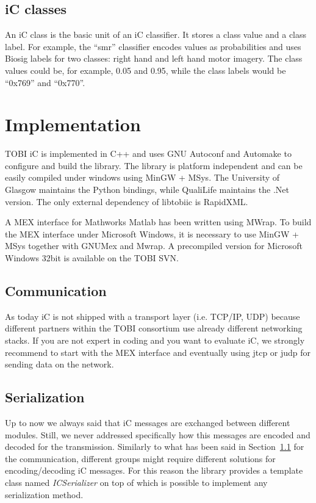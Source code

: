 \documentclass[a4paper,10pt]{article}
\begin{document}
\subsection{iC classes}
\label{sec:icclass}
An iC class is the basic unit of an iC classifier. It stores a class value and a
class label. For example, the ``smr'' classifier encodes values as probabilities
and uses Biosig labels for two classes: right hand  and left hand motor imagery.
The class values could be, for example, 0.05 and 0.95, while the class labels
would be ``0x769'' and ``0x770''.

\section{Implementation}
\label{sec:implementation}
TOBI iC is implemented in C++ and uses GNU Autoconf and Automake to configure
and build the library. The library is platform independent and can be easily
compiled under windows using MinGW + MSys. The University of Glasgow maintains
the Python bindings, while QualiLife maintains the .Net version.
The only external dependency of libtobiic is RapidXML.

A MEX interface for Mathworks Matlab has been written using MWrap. To build the
MEX interface under Microsoft Windows, it is necessary to use MinGW + MSys
together with GNUMex and Mwrap. A precompiled version for Microsoft Windows
32bit is available on the TOBI SVN.

\subsection{Communication}
\label{sec:transport}
As today iC is not shipped with a transport layer (i.e. TCP/IP, UDP) because
different partners within the TOBI consortium use already different networking
stacks. 
If you are not expert in coding and you want to evaluate iC, we strongly
recommend to start with the MEX interface and eventually using jtcp or judp for
sending data on the network.

\subsection{Serialization}
\label{sec:serialization}
Up to now we always said that iC messages are exchanged between different
modules. Still, we never addressed specifically how this messages are encoded
and decoded for the transmission.
Similarly to what has been said in Section~\ref{sec:transport} for the
communication, different groups might require different solutions for
encoding/decoding iC messages.
For this reason the library provides a template class named \emph{ICSerializer}
on top of which is possible to implement any serialization method.
\end{document}
